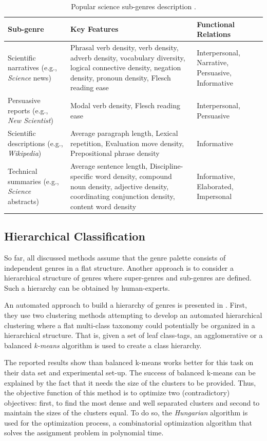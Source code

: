 \begin{itemize}
\begin{end}
\begin{table}[t]
	\center
	\caption {Popular science sub-genres description \parencite{lieungnapar2017genre}.}\label{chap:relevant_work:tbl:pop_science_registers_features}
	\begin{tabular}{p{3.5cm}p{7cm}p{2cm}}
		\hline
		Sub-genre & Key Features & Functional Relations \\
		\hline
		 Scientific narratives (e.g., \textit{Science} news) & Phrasal verb density, verb density, adverb density, vocabulary diversity, logical connective density, negation density, pronoun density, Flesch reading ease & Interpersonal, Narrative, Persuasive, Informative \\
         Persuasive reports (e.g., \textit{New Scientist}) & Modal verb density, Flesch reading ease & Interpersonal, Persuasive \\
         Scientific descriptions (e.g., \textit{Wikipedia}) & Average paragraph length, Lexical repetition, Evaluation move density, Prepositional phrase density & Informative\\
         Technical summaries (e.g., \textit{Science} abstracts)  & Average sentence length, Discipline-specific word density, compound noun density, adjective density, coordinating conjunction density, content word density & Informative, Elaborated, Impersonal  \\
  		\hline
	\end{tabular}
\end{table}

\subsection{Hierarchical Classification} 

So far, all discussed methods assume that the genre palette consists of independent genres in a flat structure. Another approach is to consider a hierarchical structure of genres where super-genres and sub-genres are defined. Such a hierarchy can be obtained by human-experts.

An automated approach to build a hierarchy of genres is presented in \parencite{madjarov2015web}. First, they use two clustering methods attempting to develop an automated hierarchical clustering where a flat multi-class taxonomy could potentially be organized in a hierarchical structure. That is, given a set of  leaf class-tags, an agglomerative or a balanced \textit{k-means} algorithm is used to create a class hierarchy. 

The reported results show than balanced k-means works better for this task on their data set and experimental set-up. The success of balanced k-means can be explained by the fact that it needs the size of the clusters to be provided. Thus, the objective function of this method is to optimize two (contradictory) objectives: first, to find the most dense and well separated clusters and second to maintain the sizes of the clusters equal. To do so, the \textit{Hungarian} algorithm is used for the optimization process, a combinatorial optimization algorithm that solves the assignment problem in polynomial time.


\end{end}
\end{itemize}
